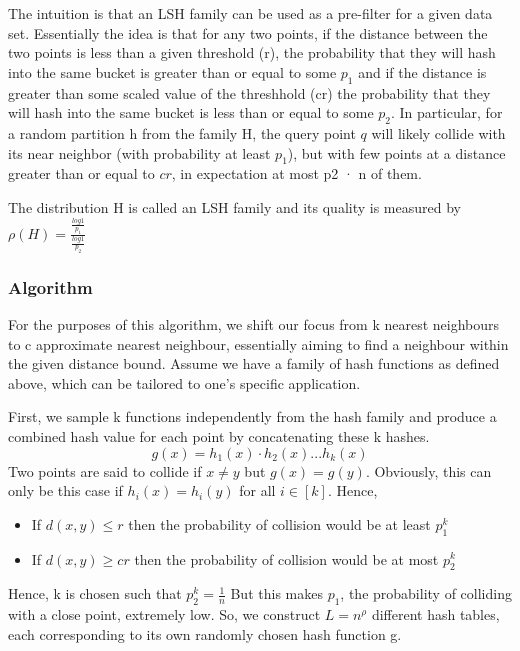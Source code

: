 The  intuition is that an LSH family can be used as a pre-filter for a given data set. Essentially the idea is that for any two points, if the distance between the two points is less than a given threshold (r), the probability that they will hash into the same bucket is greater than or equal to some $p_1$ and if the distance is greater than some scaled value of the threshhold (cr) the probability that they will hash into the same bucket is less than or equal to some $p_2$.
In particular, for a random partition h from the family H, the query point $q$ will likely collide with its near neighbor (with probability at least $p_1$), but with few points at a distance greater than or equal to $cr$, in expectation at most p2 · n of them.

The distribution H is called an LSH family and its quality is measured by $\rho(H) = \frac{\frac{log 1}{p_1}}{\frac{log 1}{p_2}}$

\subsubsection{Algorithm}
For the purposes of this algorithm, we shift our focus from k nearest neighbours to c approximate nearest neighbour, essentially aiming to find a neighbour within the given distance bound. 
Assume we have a family of hash functions as defined above, which can be tailored to one's specific application. 

First, we sample k functions independently from the hash family and produce a combined hash value for each point by concatenating these k hashes. 
\begin{equation}
    g(x) = h_1(x)\cdot h_2(x)...h_k(x)
\end{equation}
Two points are said to collide if $x \neq y $ but $g(x) = g(y)$. Obviously, this can only be this case if $h_i(x) = h_i(y)$ for all $i \in [k]$. Hence,
\begin{itemize}
    \item If $d(x, y) \leq r$ then the probability of collision would be at least $p_1^k$
    \item If $d(x, y) \geq cr$ then the probability of collision would be at most $p_2^k$
\end{itemize}

Hence, k is chosen such that $p_2^k = \frac{1}{n}$ But this makes $p_1$, the probability of colliding with a close point, extremely low. So, we construct $L= n^{\rho}$ different hash tables, each corresponding to its own randomly chosen hash function g. 

